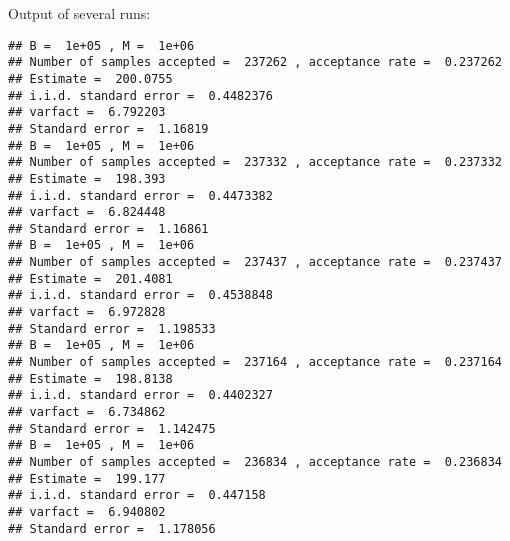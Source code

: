 \begin{knitrout}
\begin{kframe}
\begin{alltt}
 \hlkwb{=} \hlstd{(fnlist[(B}\hlopt{+}\hlstd{)}\hlopt{:}\hlopt{+}\hlstd{B)])}
 \hlkwb{=} \hlstd{(fnlist[(B}\hlopt{+}\hlstd{)}\hlopt{:}\hlopt{+}\hlstd{B)])}\hlopt{/}
 \hlkwb{=} \hlstd{(fnlist[(B}\hlopt{+}\hlstd{)}\hlopt{:}\hlopt{+}\hlstd{B)],} \hlstd{=} \hlstd{,} \hlstd{=} \hlstd{)}\hlopt{$}
 \hlkwb{=} \hlopt{*}\hlstd{(acf_k[}\hlopt{:}\hlstd{(}\hlopt{<}\hlstd{))])}\hlopt{-}
 \hlkwb{=} \hlopt{*}
 \hlkwb{=} \hlopt{/}

\hlstd{(}\hlstd{)}
\hlstd{(}\hlstd{)}
\hlstd{(}\hlstd{)}
\hlstd{(}\hlstd{)}
\hlstd{(}\hlstd{)}
\hlstd{(}\hlstd{)}
\end{alltt}
\end{kframe}
\end{knitrout}
Output of several runs:
\begin{knitrout}
\color{fgcolor}\begin{kframe}
\begin{verbatim}
## B =  1e+05 , M =  1e+06 
## Number of samples accepted =  237262 , acceptance rate =  0.237262 
## Estimate =  200.0755 
## i.i.d. standard error =  0.4482376 
## varfact =  6.792203 
## Standard error =  1.16819
## B =  1e+05 , M =  1e+06 
## Number of samples accepted =  237332 , acceptance rate =  0.237332 
## Estimate =  198.393 
## i.i.d. standard error =  0.4473382 
## varfact =  6.824448 
## Standard error =  1.16861
## B =  1e+05 , M =  1e+06 
## Number of samples accepted =  237437 , acceptance rate =  0.237437 
## Estimate =  201.4081 
## i.i.d. standard error =  0.4538848 
## varfact =  6.972828 
## Standard error =  1.198533
## B =  1e+05 , M =  1e+06 
## Number of samples accepted =  237164 , acceptance rate =  0.237164 
## Estimate =  198.8138 
## i.i.d. standard error =  0.4402327 
## varfact =  6.734862 
## Standard error =  1.142475
## B =  1e+05 , M =  1e+06 
## Number of samples accepted =  236834 , acceptance rate =  0.236834 
## Estimate =  199.177 
## i.i.d. standard error =  0.447158 
## varfact =  6.940802 
## Standard error =  1.178056
\end{verbatim}
\end{kframe}
\end{knitrout}
